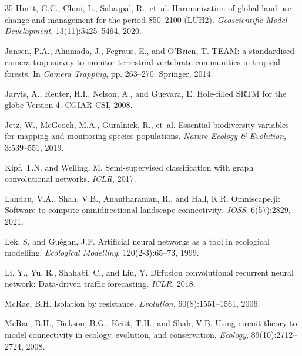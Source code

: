 \documentclass[11pt,a4paper]{article}
\begin{document}
\begin{thebibliography}{35}
Hurtt, G.C., Chini, L., Sahajpal, R., et~al.
\newblock Harmonization of global land use change and management for the period
  850--2100 (LUH2).
\newblock \emph{Geoscientific Model Development}, 13(11):5425--5464, 2020.

Jansen, P.A., Ahumada, J., Fegraus, E., and O'Brien, T.
\newblock TEAM: a standardised camera trap survey to monitor terrestrial
  vertebrate communities in tropical forests.
\newblock In \emph{Camera Trapping}, pp. 263--270. Springer, 2014.

Jarvis, A., Reuter, H.I., Nelson, A., and Guevara, E.
\newblock Hole-filled SRTM for the globe Version 4.
\newblock CGIAR-CSI, 2008.

Jetz, W., McGeoch, M.A., Guralnick, R., et~al.
\newblock Essential biodiversity variables for mapping and monitoring species
  populations.
\newblock \emph{Nature Ecology \& Evolution}, 3:539--551, 2019.

Kipf, T.N. and Welling, M.
\newblock Semi-supervised classification with graph convolutional networks.
\newblock \emph{ICLR}, 2017.

Landau, V.A., Shah, V.B., Anantharaman, R., and Hall, K.R.
\newblock Omniscape.jl: Software to compute omnidirectional landscape
  connectivity.
\newblock \emph{JOSS}, 6(57):2829, 2021.

Lek, S. and Gu{\'e}gan, J.F.
\newblock Artificial neural networks as a tool in ecological modelling.
\newblock \emph{Ecological Modelling}, 120(2-3):65--73, 1999.

Li, Y., Yu, R., Shahabi, C., and Liu, Y.
\newblock Diffusion convolutional recurrent neural network: Data-driven traffic
  forecasting.
\newblock \emph{ICLR}, 2018.

McRae, B.H.
\newblock Isolation by resistance.
\newblock \emph{Evolution}, 60(8):1551--1561, 2006.

McRae, B.H., Dickson, B.G., Keitt, T.H., and Shah, V.B.
\newblock Using circuit theory to model connectivity in ecology, evolution, and
  conservation.
\newblock \emph{Ecology}, 89(10):2712--2724, 2008.


\end{thebibliography}
\end{document}
